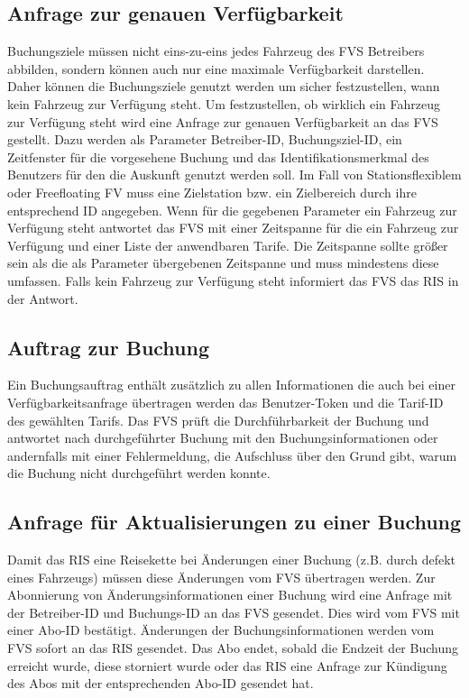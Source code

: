 \subsection{Anfrage zur genauen Verfügbarkeit}
Buchungsziele müssen nicht eins-zu-eins jedes Fahrzeug des FVS Betreibers abbilden, sondern können auch nur eine maximale Verfügbarkeit darstellen. Daher können die Buchungsziele genutzt werden um sicher festzustellen, wann kein Fahrzeug zur Verfügung steht. Um festzustellen, ob wirklich ein Fahrzeug zur Verfügung steht wird eine Anfrage zur genauen Verfügbarkeit an das FVS gestellt. Dazu werden als Parameter Betreiber-ID, Buchungsziel-ID, ein Zeitfenster für die vorgesehene Buchung und das Identifikationsmerkmal des Benutzers für den die Auskunft genutzt werden soll. Im Fall von Stationsflexiblem oder Freefloating FV muss eine Zielstation bzw. ein Zielbereich durch ihre entsprechend ID angegeben. Wenn für die gegebenen Parameter ein Fahrzeug zur Verfügung steht antwortet das FVS mit einer Zeitspanne für die ein Fahrzeug zur Verfügung und einer Liste der anwendbaren Tarife. Die Zeitspanne sollte größer sein als die als Parameter übergebenen Zeitspanne und muss mindestens diese umfassen. Falls kein Fahrzeug zur Verfügung  steht informiert das FVS das RIS in der Antwort.

\subsection{Auftrag zur Buchung}
Ein Buchungsauftrag enthält zusätzlich zu allen Informationen die auch bei einer Verfügbarkeitsanfrage übertragen werden das Benutzer-Token und die Tarif-ID des gewählten Tarifs. Das FVS prüft die Durchführbarkeit der Buchung und antwortet nach durchgeführter Buchung mit den Buchungsinformationen oder andernfalls mit einer Fehlermeldung, die Aufschluss über den Grund gibt, warum die Buchung nicht durchgeführt werden konnte.

\subsection{Anfrage für Aktualisierungen zu einer Buchung}
Damit das RIS eine Reisekette bei Änderungen einer Buchung (z.B. durch defekt eines Fahrzeugs) müssen diese Änderungen vom FVS übertragen werden. Zur Abonnierung von Änderungsinformationen einer Buchung wird eine Anfrage mit der Betreiber-ID und Buchungs-ID an das FVS gesendet. Dies wird vom FVS mit einer Abo-ID bestätigt. Änderungen der Buchungsinformationen werden vom FVS sofort an das RIS gesendet. Das Abo endet, sobald die Endzeit der Buchung erreicht wurde, diese storniert wurde oder das RIS eine Anfrage zur Kündigung des Abos mit der entsprechenden Abo-ID gesendet hat.

